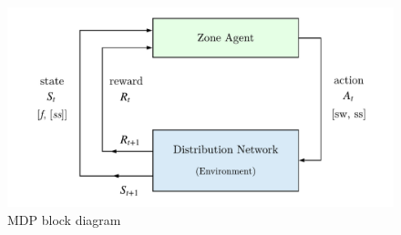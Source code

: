 \begin{figure}
    \centering
    \includegraphics[scale=0.6]{_chapter1/fig/mdp_blocks}
    \caption{MDP block diagram}
    \label{ch1:fig:mdp_blocks}
\end{figure}